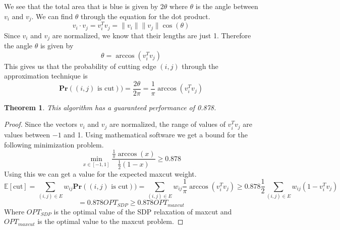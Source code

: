 \documentclass{article}
\newtheorem{theorem}{Theorem}
\begin{document}
\noindent We see that the total area that is blue is given by $2\theta$ where $\theta$ is the angle between $v_i$ and $v_j$. We can find $\theta$ through the equation for the dot product.
\[v_i \cdot v_j = v_i^Tv_j = \|v_i\| \|v_j\| \cos(\theta)\]
Since $v_i$ and $v_j$ are normalized, we know that their lengths are just 1. Therefore the angle $\theta$ is given by
\[\theta = \arccos(v_i^Tv_j)\]
This gives us that the probability of cutting edge $(i,j)$ through the approximation technique is
\[\textbf{Pr}((i,j)\text{ is cut})) = \frac{2\theta}{2\pi} = \frac{1}{\pi}\arccos(v_i^Tv_j)\]
\begin{theorem}
This algorithm has a guaranteed performance of 0.878. 
\end{theorem}
\begin{proof}
Since the vectors $v_i$ and $v_j$ are normalized, the range of values of $v_i^Tv_j$ are values between $-1$ and 1. Using mathematical software we get a bound for the following minimization problem.
\[\min_{x \in {[-1,1]}}\frac{\frac{1}{\pi}\arccos(x)}{\frac{1}{2}(1-x)} \geq 0.878\]
Using this we can get a value for the expected maxcut weight.
\[\mathbb{E}[\text{cut}] = \sum_{(i,j) \in E}w_{ij} \textbf{Pr}((i,j)\text{ is cut})) = \sum_{(i,j) \in E}w_{ij} \frac{1}{\pi}\arccos(v_i^Tv_j) \geq 0.878\frac{1}{2}\sum_{(i,j) \in E}w_{ij} (1-v_i^Tv_j) \]
\[= 0.878OPT_{SDP} \geq 0.878OPT_{maxcut}\]
Where $OPT_{SDP}$ is the optimal value of the SDP relaxation of maxcut and $OPT_{maxcut}$ is the optimal value to the maxcut problem.
\end{proof}
\nocite{*}


\end{document}
